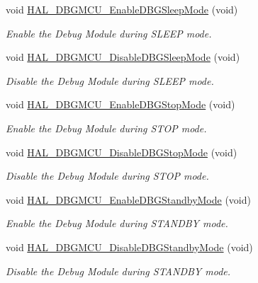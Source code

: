 \begin{DoxyCompactItemize}
void \hyperlink{group___h_a_l___exported___functions___group2_gaf031bcc71ebad9b7edf405547efd762b}{H\+A\+L\+\_\+\+D\+B\+G\+M\+C\+U\+\_\+\+Enable\+D\+B\+G\+Sleep\+Mode} (void)
\begin{DoxyCompactList}\small\item\em Enable the Debug Module during S\+L\+E\+EP mode. \end{DoxyCompactList}\item 
void \hyperlink{group___h_a_l___exported___functions___group2_gac7820d0561f19999a68d714655b901b5}{H\+A\+L\+\_\+\+D\+B\+G\+M\+C\+U\+\_\+\+Disable\+D\+B\+G\+Sleep\+Mode} (void)
\begin{DoxyCompactList}\small\item\em Disable the Debug Module during S\+L\+E\+EP mode. \end{DoxyCompactList}\item 
void \hyperlink{group___h_a_l___exported___functions___group2_gadf25043b17de4bef38a95a75fd03e5c4}{H\+A\+L\+\_\+\+D\+B\+G\+M\+C\+U\+\_\+\+Enable\+D\+B\+G\+Stop\+Mode} (void)
\begin{DoxyCompactList}\small\item\em Enable the Debug Module during S\+T\+OP mode. \end{DoxyCompactList}\item 
void \hyperlink{group___h_a_l___exported___functions___group2_ga2c93dcee35e5983d74f1000de7c042d5}{H\+A\+L\+\_\+\+D\+B\+G\+M\+C\+U\+\_\+\+Disable\+D\+B\+G\+Stop\+Mode} (void)
\begin{DoxyCompactList}\small\item\em Disable the Debug Module during S\+T\+OP mode. \end{DoxyCompactList}\item 
void \hyperlink{group___h_a_l___exported___functions___group2_ga28a1323b2eeb0a408c1cfdbfa0db5ead}{H\+A\+L\+\_\+\+D\+B\+G\+M\+C\+U\+\_\+\+Enable\+D\+B\+G\+Standby\+Mode} (void)
\begin{DoxyCompactList}\small\item\em Enable the Debug Module during S\+T\+A\+N\+D\+BY mode. \end{DoxyCompactList}\item 
void \hyperlink{group___h_a_l___exported___functions___group2_ga7faa58d8508ea3123b9f247a70379779}{H\+A\+L\+\_\+\+D\+B\+G\+M\+C\+U\+\_\+\+Disable\+D\+B\+G\+Standby\+Mode} (void)
\begin{DoxyCompactList}\small\item\em Disable the Debug Module during S\+T\+A\+N\+D\+BY mode. \end{DoxyCompactList}\item 

\end{DoxyCompactItemize}
